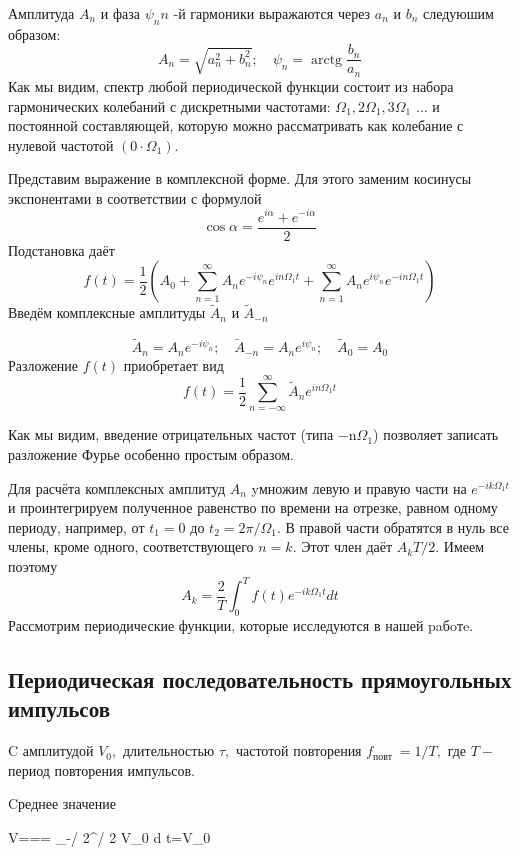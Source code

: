 \documentclass[a4paper,12pt]{article} %
\begin{document}
Амплитуда $A_{n}$ и фаза $\psi_{n} n$ -й гармоники выражаются через $a_{n}$ и $b_{n}$ следуюшим образом:
$$
A_{n}=\sqrt{a_{n}^{2}+b_{n}^{2}} ; \quad \psi_{n}=\operatorname{arctg} \frac{b_{n}}{a_{n}}
$$
Как мы видим, спектр любой периодической функции состоит из набора гармонических колебаний с дискретными частотами: $\Omega_{1}, 2 \Omega_{1}, 3 \Omega_{1}$ $\ldots$ и постоянной составляющей, которую можно рассматривать как колебание с нулевой частотой $\left(0 \cdot \Omega_{1}\right) .$

Представим выражение в комплексной форме. Для этого заменим косинусы экспонентами в соответствии с формулой
$$
\cos \alpha=\frac{e^{i \alpha}+e^{-i \alpha}}{2}
$$
Подстановка даёт
$$
f(t)=\frac{1}{2}\left(A_{0}+\sum_{n=1}^{\infty} A_{n} e^{-i \psi_{n}} e^{i n \Omega_{1} t}+\sum_{n=1}^{\infty} A_{n} e^{i \psi_{n}} e^{-i n \Omega_{1} t}\right)
$$
Введём комплексные амплитуды $\tilde{A}_{n}$ и $\tilde{A}_{-n}$

$$
\tilde{A}_{n}=A_{n} e^{-i \psi_{n}} ; \quad \tilde{A}_{-n}=A_{n} e^{i \psi_{n}} ; \quad \tilde{A}_{0}=A_{0}
$$
Разложение $f(t)$ приобретает вид
$$
f(t)=\frac{1}{2} \sum_{n=-\infty}^{\infty} \tilde{A}_{n} e^{i n \Omega_{1} t}
$$

Как мы видим, введение отрицательных частот (типа −n$\Omega_1$) позволяет записать разложение Фурье особенно простым образом. 

Для расчёта комплексных амплитуд $A_{n}$ yмножим левую и правую части на $e^{-i k \Omega_{1} t}$ и проинтегрируем полученное равенство по времени на отрезке, равном одному периоду, например, от $t_{1}=0$ до $t_{2}=2 \pi / \Omega_{1} .$ В правой части обратятся в нуль все члены, кроме одного, соответствующего $n=k .$ Этот член даёт $A_{k} T / 2 .$ Имеем поэтому
$$
A_{k}=\frac{2}{T} \int_{0}^{T} f(t) e^{-i k \Omega_{1} t} d t
$$
Рассмотрим периодические функции, которые исследуются в нашей paбoтe.


\subsection{Периодическая последовательность прямоугольных импульсов}
C амплитудой $V_{0},$ длительностью $\tau,$ частотой повторения $f_{\text {повт }}=1 / T,$ где $T-$ период повторения импульсов.


Cреднее значение


\langle V\rangle=== \int_{-\tau / 2}^{\tau / 2} V_{0} d t=V_{0} 
\end{document}
